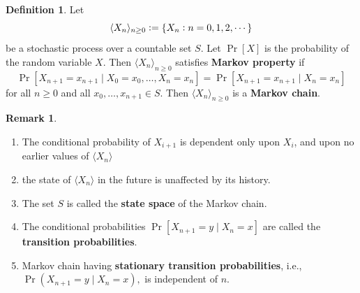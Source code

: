 \documentclass[12pt,openany]{book}
\theoremstyle{definition}
\newtheorem{definition}{Definition}[chapter]
\newtheorem{remark}{Remark}[chapter]
\newcommand{\ie}{\textnormal{i.e.}}
\newcommand{\markov}[1]{\langle #1\rangle}
\begin{document}
	\begin{tcolorbox}[colback=white,colframe=defcolor,arc=5pt,title={\color{white}\bf Markov Chain}]
		\begin{definition}
			Let $$
			\langle X_n\rangle_{n\geq 0}:=\set{X_n:n=0,1,2,\cdots}
			$$ be a stochastic process over a countable set $S$. Let $\Pr[X]$ is the probability of the random variable $X$. Then $\langle X_n\rangle_{n\geq 0}$ satisfies \textbf{Markov property} if \[
			\Pr[X_{n+1}=x_{n+1}\mid X_0=x_0,\dots,X_n=x_n]=\Pr[X_{n+1}=x_{n+1}\mid X_n=x_n]
			\] for all $n\geq 0$ and all $x_0,\dots, x_{n+1}\in S$. Then $\markov{X_n}_{n\geq 0}$ is a \textbf{Markov chain}.
		\end{definition}
	\end{tcolorbox}
	\begin{remark}
		\ \begin{enumerate}[(1)]
			\item The conditional probability of $X_{i+1}$ is dependent only upon $X_i$, and upon no earlier values of $\markov{X_n}$
			\item the state of $\markov{X_n}$ in the future is unaffected by its history.
			\item The set $S$ is called the \textbf{state space} of the Markov chain.
			\item The conditional probabilities $\Pr[X_{n+1}= y\mid X_n = x]$ are called the \textbf{transition probabilities}.
			\item Markov chain having \textbf{stationary transition probabilities}, \ie, $\Pr(X_{n+1}=y\mid X_n=x),$ is independent of $n$.
		\end{enumerate}
	\end{remark}
	\vspace{20pt}
	\newpage
\end{document}
